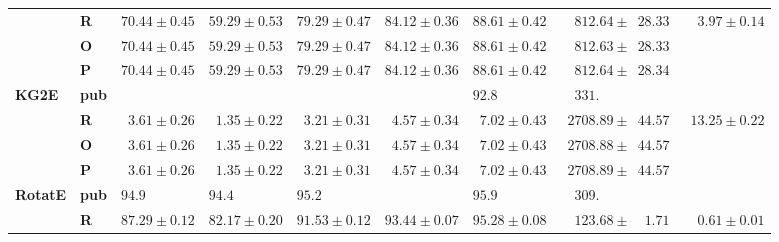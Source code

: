 \begin{tabular}{llrrrrrrr}
       & \textbf{R} &            $70.44 \pm 0.45$ &            $59.29 \pm 0.53$ &            $79.29 \pm 0.47$ &            $84.12 \pm 0.36$ &            $88.61 \pm 0.42$ &  $\phantom{00}812.64 \pm \phantom{0}28.33$ &  $\phantom{00}3.97 \pm 0.14$ \\
       & \textbf{O} &            $70.44 \pm 0.45$ &            $59.29 \pm 0.53$ &            $79.29 \pm 0.47$ &            $84.12 \pm 0.36$ &            $88.61 \pm 0.42$ &  $\phantom{00}812.63 \pm \phantom{0}28.33$ &                              \\
       & \textbf{P} &            $70.44 \pm 0.45$ &            $59.29 \pm 0.53$ &            $79.29 \pm 0.47$ &            $84.12 \pm 0.36$ &            $88.61 \pm 0.42$ &  $\phantom{00}812.64 \pm \phantom{0}28.34$ &                              \\\midrule
\textbf{KG2E} & \textbf{pub} &                             &                             &                             &                             &  $92.8\phantom{0 \pm 0.00}$ &  $\phantom{00}331.\phantom{00 \pm 000.00}$ &                              \\
       & \textbf{R} &  $\phantom{0}3.61 \pm 0.26$ &  $\phantom{0}1.35 \pm 0.22$ &  $\phantom{0}3.21 \pm 0.31$ &  $\phantom{0}4.57 \pm 0.34$ &  $\phantom{0}7.02 \pm 0.43$ &  $\phantom{0}2708.89 \pm \phantom{0}44.57$ &  $\phantom{0}13.25 \pm 0.22$ \\
       & \textbf{O} &  $\phantom{0}3.61 \pm 0.26$ &  $\phantom{0}1.35 \pm 0.22$ &  $\phantom{0}3.21 \pm 0.31$ &  $\phantom{0}4.57 \pm 0.34$ &  $\phantom{0}7.02 \pm 0.43$ &  $\phantom{0}2708.88 \pm \phantom{0}44.57$ &                              \\
       & \textbf{P} &  $\phantom{0}3.61 \pm 0.26$ &  $\phantom{0}1.35 \pm 0.22$ &  $\phantom{0}3.21 \pm 0.31$ &  $\phantom{0}4.57 \pm 0.34$ &  $\phantom{0}7.02 \pm 0.43$ &  $\phantom{0}2708.89 \pm \phantom{0}44.57$ &                              \\\midrule
\textbf{RotatE} & \textbf{pub} &  $94.9\phantom{0 \pm 0.00}$ &  $94.4\phantom{0 \pm 0.00}$ &  $95.2\phantom{0 \pm 0.00}$ &                             &  $95.9\phantom{0 \pm 0.00}$ &  $\phantom{00}309.\phantom{00 \pm 000.00}$ &                              \\
       & \textbf{R} &            $87.29 \pm 0.12$ &            $82.17 \pm 0.20$ &            $91.53 \pm 0.12$ &            $93.44 \pm 0.07$ &            $95.28 \pm 0.08$ &  $\phantom{00}123.68 \pm \phantom{00}1.71$ &  $\phantom{00}0.61 \pm 0.01$ \\\midrule

\end{tabular}
